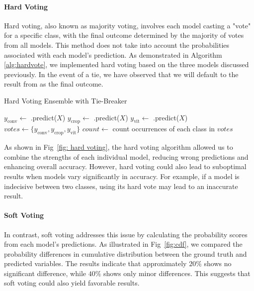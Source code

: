 \paragraph{Hard Voting}
Hard voting, also known as majority voting, involves each model casting a "vote" for a specific class, with the final outcome determined by the majority of votes from all models. This method does not take into account the probabilities associated with each model's prediction. As demonstrated in Algorithm \ref{alg:hardvote}, we implemented hard voting based on the three models discussed previously. In the event of a tie, we have observed that we will default to the result from \CONV{} as the final outcome.


\begin{algorithm}[ht]
\SetAlgoLined
{}
\caption{Hard Voting Ensemble with Tie-Breaker}
\label{alg:hardvote}
$y_{\text{conv}} \gets$ \CONV.predict($X$)\;
$y_{\text{crop}} \gets$ \CROP.predict($X$)\;
$y_{\text{vit}} \gets$ \VIT.predict($X$)\;
$votes \gets \{y_{\text{conv}}, y_{\text{crop}}, y_{\text{vit}}\}$\;
$count \gets$ count occurrences of each class in $votes$\;
\end{algorithm}

As shown in Fig~\ref{fig: hard voting}, the hard voting algorithm allowed us to combine the strengths of each individual model, reducing wrong predictions and enhancing overall accuracy. However, hard voting could also lead to suboptimal results when models vary significantly in accuracy. For example, if a model is indecisive between two classes, using its hard vote may lead to an inaccurate result.

\paragraph{Soft Voting}

In contrast, soft voting addresses this issue by calculating the probability scores from each model's predictions. As illustrated in Fig~\ref{fig:cdf}, we compared the probability differences in cumulative distribution between the ground truth and predicted variables. The results indicate that approximately $20\%$ shows no significant difference, while $40\%$ shows only minor differences. This suggests that soft voting could also yield favorable results.

